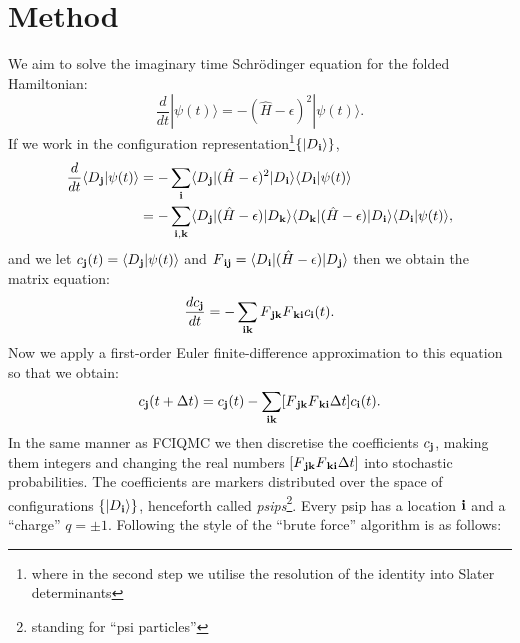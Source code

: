\documentclass{article}
\newcommand{\bra}[1]{\langle #1|}
\newcommand{\ket}[1]{|#1\rangle}
\newcommand{\braket}[2]{\langle #1|#2\rangle}
\newcommand{\D}[1]{D\/_{\bf #1 } }
\newcommand{\ci}[1]{c\/_{\bf #1 } }
\newcommand{\fij}[2]{F\/_{\bf #1 #2} }
\begin{document}
\section{Method}
We aim to solve the imaginary time Schr\"{o}dinger equation for the folded Hamiltonian:
\begin{equation}
\frac{d}{dt} \ket{\psi(t)} = -(\hat{H} - \epsilon)^{2} \ket{\psi(t)}.
\end{equation}
If we work in the configuration representation\footnote{where in the second step we utilise the resolution of the identity into Slater determinants}$\{ \ket{\D{i} } \} $,
\begin{align}
\frac{d}{dt} \braket{\D{j}}{\psi(t)} &= -\sum\limits_{\bf i}\bra{\D{j}}(\hat{H} - \epsilon)^{2} \ket{\D{i}}\braket{\D{i}}{\psi(t)} \nonumber \\
 &=  -\sum\limits_{{\bf i},{\bf k}} \bra{\D{j}}(\hat{H} - \epsilon)\ket{\D{k}}\bra{\D{k}}(\hat{H} - \epsilon) \ket{\D{i}}\braket{\D{i}}{\psi(t)} ,
\end{align}
 and we let $\ci{j}(t) = \braket{\D{j}}{\psi(t)}$ and $\fij{i}{j} = \bra{\D{i}}(\hat{H} - \epsilon)\ket{\D{j}}$ then we obtain the matrix equation:
\begin{equation}
\frac{d\ci{j}}{dt}= - \sum\limits_{{\bf i }{ \bf k } } \fij{j}{k} \fij{k}{i} \ci{i}(t).
\end{equation}
Now we apply a first-order Euler finite-difference approximation to this equation so that we obtain:
\begin{equation}
\ci{j}(t+\Delta t)= \ci{j}(t) - \sum\limits_{{\bf i }{ \bf k } } [\fij{j}{k} \fij{k}{i} \Delta t]\ci{i}(t).
\end{equation}
In the same manner as FCIQMC we then discretise the coefficients $\ci{j}$, making them integers and changing the real numbers $[\fij{j}{k} \fij{k}{i} \Delta t]$ into stochastic probabilities. The coefficients are markers distributed over the space of configurations $\{\ket{\D{i}}\}$, henceforth called {\em psips\/}\footnote{standing for ``psi particles''}. Every psip has a location $\bf i$ and a ``charge'' $q = \pm 1$. Following the style of \cite{FoulkesSpencer} the ``brute force'' algorithm is as follows:

\hspace{10pt}
\end{document}
